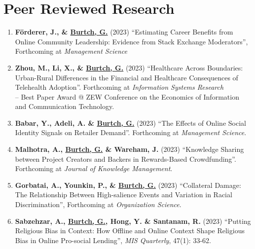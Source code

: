 \documentclass[10.5pt,letterpaper,sans]{moderncv}        %
\renewcommand*{\bibliographyitemlabel}{[\arabic{enumiv}]} %
\renewcommand*{\bibliographyitemlabel}{\arabic{enumiv}.} %
\begin{document}

\vspace{8 pt}

\section{Peer Reviewed Research}

\smallskip

\begin{enumerate}[leftmargin=!,labelindent=5pt,itemindent=-15pt]

\item \textbf{F{\"o}rderer, J., \& \underline{Burtch, G.}} (2023) ``Estimating Career Benefits from Online Community Leadership: Evidence from Stack Exchange Moderators'', Forthcoming at \textit{Management Science}

\item \textbf{Zhou, M., Li, X., \& \underline{Burtch, G.}} (2023) ``Healthcare Across Boundaries: Urban-Rural Differences in the Financial and Healthcare Consequences of Telehealth Adoption''. Forthcoming at \textit{Information Systems Research} \\-- Best Paper Award @ ZEW Conference on the Economics of Information and Communication Technology.

\item \textbf{Babar, Y., Adeli, A. \& \underline{Burtch, G.}} (2023) ``The Effects of Online Social Identity Signals on Retailer Demand''. Forthcoming at \textit{Management Science}.

\item \textbf{Malhotra, A., \underline{Burtch, G.} \& Wareham, J.} (2023) ``Knowledge Sharing between Project Creators and Backers in Rewards-Based Crowdfunding''. Forthcoming at \textit{Journal of Knowledge Management}.

\item \textbf{Gorbatai, A., Younkin, P., \& \underline{Burtch, G.}} (2023) ``Collateral Damage: The Relationship Between High-salience Events and Variation in Racial Discrimination'', Forthcoming at \textit{Organization Science}.

\item \textbf{Sabzehzar, A., \underline{Burtch, G.}, Hong, Y. \& Santanam, R.} (2023) ``Putting Religious Bias in Context: How Offline and Online Context Shape Religious Bias in Online Pro-social Lending'', \textit{MIS Quarterly}, 47(1): 33-62.


\end{enumerate}
\end{document}

